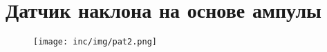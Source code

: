 \chapter{Датчик наклона на основе ампулы}
\label{cha:appendix2}

\begin{figure}
\centering
\texttt{[image: inc/img/pat2.png]}
\end{figure}

